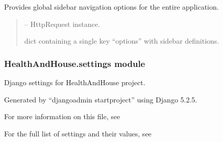 \documentclass[a4paper,11pt,spanish]{sphinxmanual}
\begin{document}

\begin{fulllineitems}
\label{\detokenize{api/HealthAndHouse/HealthAndHouse.context_processors:HealthAndHouse.context_processors.sidebar_context}}
\pysigstartsignatures
\pysiglinewithargsret
{}
{}
{}
\pysigstopsignatures
\sphinxAtStartPar
Provides global sidebar navigation options for the entire application.
\begin{quote}\begin{description}
\sphinxAtStartPar
{} – HttpRequest instance.

\sphinxAtStartPar
dict containing a single key “options” with sidebar definitions.

\end{description}\end{quote}

\end{fulllineitems}


\sphinxstepscope


\subsubsection{HealthAndHouse.settings module}
\label{\detokenize{api/HealthAndHouse/HealthAndHouse.settings:module-HealthAndHouse.settings}}\label{\detokenize{api/HealthAndHouse/HealthAndHouse.settings:healthandhouse-settings-module}}\label{\detokenize{api/HealthAndHouse/HealthAndHouse.settings::doc}}
\sphinxAtStartPar
Django settings for HealthAndHouse project.

\sphinxAtStartPar
Generated by “django\sphinxhyphen{}admin startproject” using Django 5.2.5.

\sphinxAtStartPar
For more information on this file, see

\sphinxAtStartPar
For the full list of settings and their values, see
\end{document}
